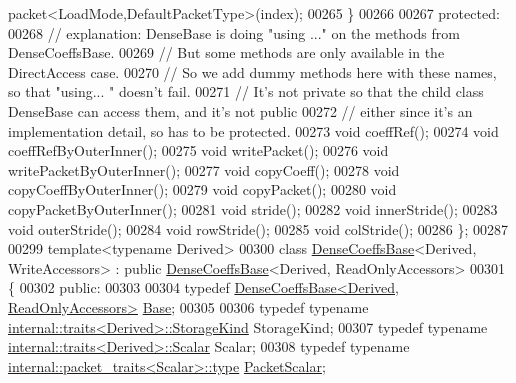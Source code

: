 \begin{DoxyCode}
      packet<LoadMode,DefaultPacketType>(index);
00265     \}
00266 
00267   \textcolor{keyword}{protected}:
00268     \textcolor{comment}{// explanation: DenseBase is doing "using ..." on the methods from DenseCoeffsBase.}
00269     \textcolor{comment}{// But some methods are only available in the DirectAccess case.}
00270     \textcolor{comment}{// So we add dummy methods here with these names, so that "using... " doesn't fail.}
00271     \textcolor{comment}{// It's not private so that the child class DenseBase can access them, and it's not public}
00272     \textcolor{comment}{// either since it's an implementation detail, so has to be protected.}
00273     \textcolor{keywordtype}{void} coeffRef();
00274     \textcolor{keywordtype}{void} coeffRefByOuterInner();
00275     \textcolor{keywordtype}{void} writePacket();
00276     \textcolor{keywordtype}{void} writePacketByOuterInner();
00277     \textcolor{keywordtype}{void} copyCoeff();
00278     \textcolor{keywordtype}{void} copyCoeffByOuterInner();
00279     \textcolor{keywordtype}{void} copyPacket();
00280     \textcolor{keywordtype}{void} copyPacketByOuterInner();
00281     \textcolor{keywordtype}{void} stride();
00282     \textcolor{keywordtype}{void} innerStride();
00283     \textcolor{keywordtype}{void} outerStride();
00284     \textcolor{keywordtype}{void} rowStride();
00285     \textcolor{keywordtype}{void} colStride();
00286 \};
00287 
00299 \textcolor{keyword}{template}<\textcolor{keyword}{typename} Derived>
00300 \textcolor{keyword}{class }\hyperlink{class_eigen_1_1_dense_coeffs_base}{DenseCoeffsBase}<Derived, WriteAccessors> : \textcolor{keyword}{public} 
      \hyperlink{class_eigen_1_1_dense_coeffs_base}{DenseCoeffsBase}<Derived, ReadOnlyAccessors>
00301 \{
00302   \textcolor{keyword}{public}:
00303 
00304     \textcolor{keyword}{typedef} \hyperlink{group___core___module_class_eigen_1_1_dense_coeffs_base_3_01_derived_00_01_read_only_accessors_01_4}{DenseCoeffsBase<Derived, ReadOnlyAccessors>} 
      \hyperlink{group___core___module_struct_eigen_1_1_eigen_base}{Base};
00305 
00306     \textcolor{keyword}{typedef} \textcolor{keyword}{typename} \hyperlink{struct_eigen_1_1internal_1_1traits}{internal::traits<Derived>::StorageKind} 
      StorageKind;
00307     \textcolor{keyword}{typedef} \textcolor{keyword}{typename} \hyperlink{struct_eigen_1_1internal_1_1traits}{internal::traits<Derived>::Scalar} Scalar;
00308     \textcolor{keyword}{typedef} \textcolor{keyword}{typename} \hyperlink{group___sparse_core___module}{internal::packet\_traits<Scalar>::type} 
      \hyperlink{group___sparse_core___module}{PacketScalar};

\end{DoxyCode}
